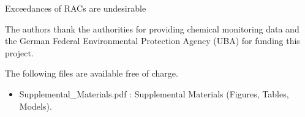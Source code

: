 \documentclass[journal=esthag,manuscript=article]{achemso}
\begin{document}
Exceedances of RACs are undesirable 




\begin{acknowledgement}
The authors thank the authorities for providing chemical monitoring data and the German Federal Environmental Protection Agency (UBA) for funding this project.
\end{acknowledgement}


\begin{suppinfo}
The following files are available free of charge.
\begin{itemize}
  \item Supplemental\_Materials.pdf : Supplemental Materials (Figures, Tables, Models).
\end{itemize}
\end{suppinfo}




\end{document}
